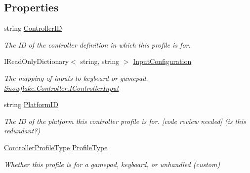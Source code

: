 \subsection*{Properties}
\begin{DoxyCompactItemize}
\item 
string \hyperlink{interface_snowflake_1_1_controller_1_1_i_controller_profile_a092d06272423ca9603f422361c796991}{Controller\+I\+D}
\begin{DoxyCompactList}\small\item\em The I\+D of the controller definition in which this profile is for. \end{DoxyCompactList}\item 
I\+Read\+Only\+Dictionary$<$ string, string $>$ \hyperlink{interface_snowflake_1_1_controller_1_1_i_controller_profile_ab4099e38a03cdd075a368d169ccbe6b4}{Input\+Configuration}
\begin{DoxyCompactList}\small\item\em The mapping of inputs to keyboard or gamepad. \hyperlink{interface_snowflake_1_1_controller_1_1_i_controller_input}{Snowflake.\+Controller.\+I\+Controller\+Input} \end{DoxyCompactList}\item 
string \hyperlink{interface_snowflake_1_1_controller_1_1_i_controller_profile_a8427942ab6807a76853f9992488831ff}{Platform\+I\+D}
\begin{DoxyCompactList}\small\item\em The I\+D of the platform this controller profile is for. \mbox{[}code review needed\mbox{]} (is this redundant?) \end{DoxyCompactList}\item 
\hyperlink{namespace_snowflake_1_1_controller_af6896d98053b4f8f2d42c32c6fb05c96}{Controller\+Profile\+Type} \hyperlink{interface_snowflake_1_1_controller_1_1_i_controller_profile_a4822ec076ec75e9895714a87231e3a6c}{Profile\+Type}
\begin{DoxyCompactList}\small\item\em Whether this profile is for a gamepad, keyboard, or unhandled (custom) \end{DoxyCompactList}\end{DoxyCompactItemize}


